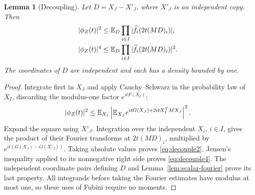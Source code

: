 \documentclass[11pt]{article}
\numberwithin{equation}{section}
\newtheorem{lemma}[theorem]{Lemma}
\theoremstyle{definition}\newtheorem{definition}[theorem]{Definition}
\theoremstyle{remark}\newtheorem{remark}[theorem]{Remark}
\newcommand{\1}{\mathbf 1}\newcommand{\diag}{\operatorname{diag}}
\begin{document}
\begin{lemma}[Decoupling]\label{lem:decoupling}
Let $D=X_J-X'_J$, where $X'_J$ is an independent copy. Then
\begin{align}
 |\phi_Z(t)|^2&\le\mathbb E_D\prod_{i\in I}|\widehat f_i(2t(MD)_i)|,\label{eq:decouple2}\\
 |\phi_Z(t)|^4&\le\mathbb E_D\prod_{i\in I}|\widehat f_i(2t(MD)_i)|^2.\label{eq:decouple4}
\end{align}
The coordinates of $D$ are independent and each has a density bounded by one.
\end{lemma}
\begin{proof}
Integrate first in $X_J$ and apply Cauchy--Schwarz in the probability law of $X_I$, discarding the modulus-one factor $e^{itF(X_I)}$:
\[
 |\phi_Z(t)|^2\le\mathbb E_{X_I}\left|\mathbb E_{X_J}e^{itG(X_J)+2itX_I^TMX_J}\right|^2.
\]
Expand the square using $X'_J$. Integration over the independent $X_i$, $i\in I$, gives the product of their Fourier transforms at $2t(MD)_i$, multiplied by $e^{it(G(X_J)-G(X'_J))}$. Taking absolute values proves \eqref{eq:decouple2}. Jensen's inequality applied to its nonnegative right side proves \eqref{eq:decouple4}. The independent coordinate pairs defining $D$ and Lemma~\ref{lem:scalar-fourier} prove its last property. All integrands before taking the Fourier estimates have modulus at most one, so these uses of Fubini require no moments.
\end{proof}
\end{document}
